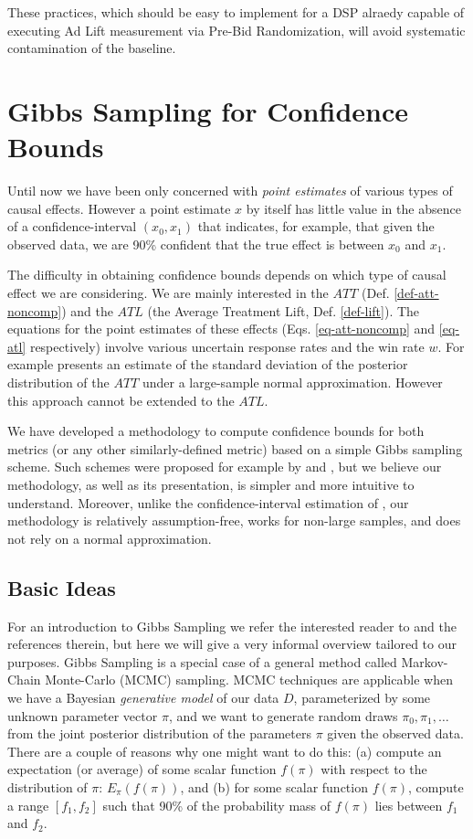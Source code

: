 \documentclass[11pt,a4paper]{article}
\theoremstyle{definition}
\theoremstyle{remark}
\theoremstyle{definition}
\theoremstyle{definition}
\theoremstyle{definition}
\theoremstyle{definition}
\theoremstyle{definition}
\theoremstyle{definition}
\begin{document}
These practices, which should be easy to implement for a DSP alraedy capable of executing Ad Lift measurement via Pre-Bid Randomization, will avoid systematic contamination of the baseline.  

\section{Gibbs Sampling for Confidence Bounds} \label{sec-gibbs}

Until now we have been only concerned with \textit{point estimates} of various types of causal effects. However a point estimate $x$ by itself has little value in the absence of a confidence-interval $(x_0,x_1)$ that indicates, for example, that given the observed data, we are 90\% confident that the true effect is between $x_0$ and $x_1$.

The difficulty in obtaining confidence bounds depends on which type of causal effect we are considering. 
We are mainly interested in the $ATT$ (Def. \ref{def-att-noncomp}) and the 
$ATL$ (the Average Treatment Lift, Def. \ref{def-lift}). 
The equations for the point estimates of these effects (Eqs. \ref{eq-att-noncomp} and \ref{eq-atl} respectively) involve various uncertain response rates and the win rate $w$. 
For example \cite{Imbens1997a} presents an estimate of the standard deviation of the posterior distribution of the $ATT$ under a large-sample normal approximation. 
However this approach cannot be extended to the $ATL$.

We have developed a methodology to compute confidence bounds for both metrics (or any other similarly-defined metric) based on a simple Gibbs sampling scheme. Such schemes were proposed for example by \cite{Chickering1996} and \cite{Barajas2012}, but we believe our methodology, as well as its presentation, is simpler and more intuitive to understand. Moreover, unlike the confidence-interval estimation of \cite{Imbens1997a}, our methodology is relatively assumption-free, works for non-large samples, and does not rely on a normal approximation.

\subsection{Basic Ideas}

For an introduction to Gibbs Sampling we refer the interested reader to \cite{resnik2010gibbs} and the references therein, but here we will give a very informal overview tailored to our purposes. Gibbs Sampling is a special case of a general  method called Markov-Chain Monte-Carlo (MCMC) sampling. MCMC techniques are applicable when we have a Bayesian \textit{generative model} of our data $D$, parameterized by some unknown parameter vector $\pi$, and we want to generate random draws $\pi_0, \pi_1, \ldots$ from the joint posterior distribution of the parameters $\pi$ given the observed data. There are a couple of reasons why one might want to do this: (a) compute an expectation (or average) of some scalar function $f(\pi)$ with respect to the distribution of $\pi$: $E_\pi(f(\pi))$, and (b) for some scalar function $f(\pi)$, compute a range $[f_1, f_2]$ such that 90\% of the probability mass of $f(\pi)$ lies between $f_1$ and $f_2$.
\end{document}
